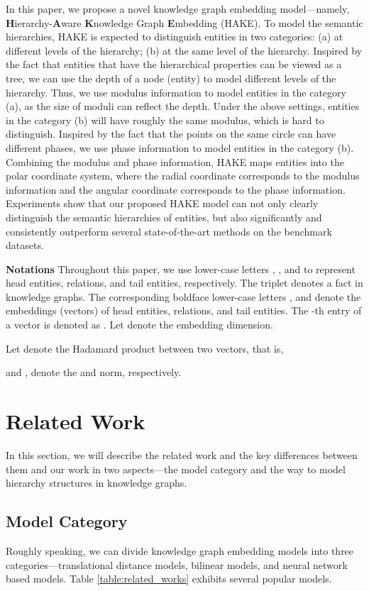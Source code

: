 \documentclass[letterpaper]{article} \usepackage{aaai20}  \usepackage{times}  \usepackage{helvet} \usepackage{courier}  \usepackage[hyphens]{url}  \usepackage{graphicx} \urlstyle{rm} \def\UrlFont{\rm}  \usepackage{graphicx}  \frenchspacing  \setlength{\pdfpagewidth}{8.5in}  \setlength{\pdfpageheight}{11in}
\begin{document}
In this paper, we propose a novel knowledge graph embedding model---namely, \textbf{H}ierarchy-\textbf{A}ware \textbf{K}nowledge Graph \textbf{E}mbedding (HAKE). To model the semantic hierarchies, HAKE is expected to distinguish entities in two categories: (a) at different levels of the hierarchy; (b) at the same level of the hierarchy. Inspired by the fact that entities that have the hierarchical properties can be viewed as a tree, we can use the depth of a node (entity) to model different levels of the hierarchy. Thus, we use modulus information to model entities in the category (a), as the size of moduli can reflect the depth. Under the above settings, entities in the category (b) will have roughly the same modulus, which is hard to distinguish. Inspired by the fact that the points on the same circle can have different phases, we use phase information to model entities in the category (b). Combining the modulus and phase information, HAKE maps entities into the polar coordinate system, where the radial coordinate corresponds to the modulus information and the angular coordinate corresponds to the phase information.
Experiments show that our proposed HAKE model can not only clearly distinguish the semantic hierarchies of entities, but also significantly and consistently outperform several state-of-the-art methods on the benchmark datasets.


\vspace{3mm}
\noindent
\textbf{Notations} Throughout this paper, we use lower-case letters , , and  to represent head entities, relations, and tail entities, respectively. The triplet  denotes a fact in knowledge graphs. The corresponding boldface lower-case letters ,  and  denote the embeddings (vectors) of head entities, relations, and tail entities. The -th entry of a vector  is denoted as . 
Let  denote the embedding dimension.

Let  denote the Hadamard product between two vectors, that is,

and ,  denote the  and  norm, respectively. 


\section{Related Work}
In this section, we will describe the related work and the key differences between them and our work in two aspects---the model category and the way to model hierarchy structures in knowledge graphs.

\subsection{Model Category}
Roughly speaking, we can divide knowledge graph embedding models into three categories---translational distance models, bilinear models, and neural network based models. Table \ref{table:related_works} exhibits several popular models.
\end{document}
